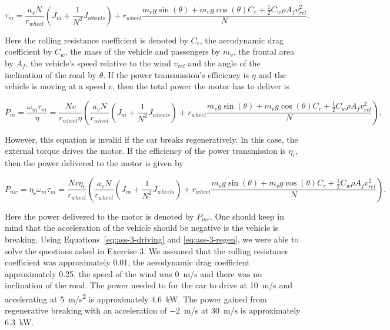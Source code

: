 \documentclass[11pt,titlepage]{report}
\begin{document}
\begin{equation}
	\tau_{m} =
	\frac{a_v N}{r_{wheel}} (J_m + \frac{1}{N^2} J_{wheels}) + r_{wheel} \frac{
		m_v g \sin{(\theta)} +
		m_v g \cos{(\theta)} C_r +
		\frac{1}{2} C_w \rho A_f v_{rel}^2
	}{N}.
\end{equation}

Here the rolling resistance coefficient is denoted by $C_r$, the aerodynamic drag coefficient by $C_w$, the mass of the vehicle and passengers by $m_v$, the frontal area by $A_f$, the vehicle's speed relative to the wind $v_{rel}$ and the angle of the inclination of the road by $\theta$. If the power transmission's efficiency is $\eta$ and the vehicle is moving at a speed $v$, then the total power the motor has to deliver is

\begin{equation} \label{eq:ass-3-driving}
	P_{m} = \frac{\omega_m \tau_{m}}{\eta} =
	\frac{N v}{r_{wheel} \eta} \left(
		\frac{a_v N}{r_{wheel}} (J_m + \frac{1}{N^2} J_{wheels}) + r_{wheel} \frac{
			m_v g \sin{(\theta)} +
			m_v g \cos{(\theta)} C_r +
			\frac{1}{2} C_w \rho A_f v_{rel}^2
		}{N}
	\right).
\end{equation}

However, this equation is invalid if the car breaks regeneratively. In this case, the external torque drives the motor. If the efficiency of the power transmission is $\eta_r$, then the power delivered to the motor is given by

\begin{equation} \label{eq:ass-3-regen}
	P_{mr} = \eta_r \omega_m \tau_{m} =
	\frac{N v \eta_r}{r_{wheel}} \left(
		\frac{a_v N}{r_{wheel}} (J_m + \frac{1}{N^2} J_{wheels}) + r_{wheel} \frac{
			m_v g \sin{(\theta)} +
			m_v g \cos{(\theta)} C_r +
			\frac{1}{2} C_w \rho A_f v_{rel}^2
		}{N}
	\right).
\end{equation}

Here the power delivered to the motor is denoted by $P_{mr}$. One should keep in mind that the acceleration of the vehicle should be negative is the vehicle is breaking. Using Equations~\ref{eq:ass-3-driving} and \ref{eq:ass-3-regen}, we were able to solve the questions asked in Exercise 3. We assumed that the rolling resistance coefficient was approximately \num{0.01}, the aerodynamic drag coefficient approximately \num{0.25}, the speed of the wind was \SI{0}{m/s} and there was no inclination of the road. The power needed to for the car to drive at \SI{10}{m/s} and accelerating at \SI{5}{m/s^2} is approximately \SI{4.6}{kW}. The power gained from regenerative breaking with an acceleration of \SI{-2}{m/s} at \SI{30}{m/s} is approximately \SI{6.3}{kW}.
\end{document}
